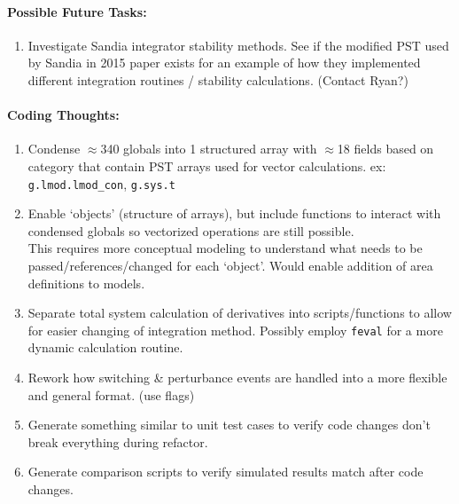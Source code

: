 \documentclass[12pt]{article}
\begin{document}
\begin{multicols}{2}
\paragraph{Possible Future Tasks:} %
	\begin{enumerate}
		\item Investigate Sandia integrator stability methods.	
		See if the modified PST used by Sandia in 2015 paper exists for an example of how they implemented different integration routines / stability calculations.	(Contact Ryan?)
	\end{enumerate}

\vfill\null
\columnbreak

\paragraph{Coding Thoughts:} 
	\begin{enumerate}

		\itemsep 0em 
		\item Condense $\approx$340 globals into 1 structured array with $\approx$18 fields based on category that contain PST arrays used for vector calculations. ex: \verb|g.lmod.lmod_con|, \verb|g.sys.t|
		\item Enable `objects' (structure of arrays), but include functions to interact with condensed globals so vectorized operations are still possible.\\
		This requires more conceptual modeling to understand what needs to be passed/references/changed for each `object'.
		Would enable addition of area definitions to models.
		\item Separate total system calculation of derivatives into scripts/functions to allow for easier changing of integration method.
		Possibly employ \verb|feval| for a more dynamic calculation routine.
		\item Rework how switching \& perturbance events are handled into a more flexible and general format. (use flags)
		\item Generate something similar to unit test cases to verify code changes don't break everything during refactor.
		\item Generate comparison scripts to verify simulated results match after code changes.
	\end{enumerate}
	



\end{multicols}
\end{document}
